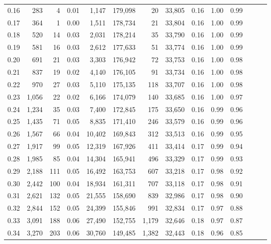 \begin{tabular}{rrrrrrrrrrrrrr}
0.16 &    283 &    4 &  0.01 &    1,147 &  179,098 &      20 &  33,805 &  0.16 &  1.00 &      0.99 \\
0.17 &    364 &    1 &  0.00 &    1,511 &  178,734 &      21 &  33,804 &  0.16 &  1.00 &      0.99 \\
0.18 &    520 &   14 &  0.03 &    2,031 &  178,214 &      35 &  33,790 &  0.16 &  1.00 &      0.99 \\
0.19 &    581 &   16 &  0.03 &    2,612 &  177,633 &      51 &  33,774 &  0.16 &  1.00 &      0.99 \\
0.20 &    691 &   21 &  0.03 &    3,303 &  176,942 &      72 &  33,753 &  0.16 &  1.00 &      0.98 \\
0.21 &    837 &   19 &  0.02 &    4,140 &  176,105 &      91 &  33,734 &  0.16 &  1.00 &      0.98 \\
0.22 &    970 &   27 &  0.03 &    5,110 &  175,135 &     118 &  33,707 &  0.16 &  1.00 &      0.98 \\
0.23 &  1,056 &   22 &  0.02 &    6,166 &  174,079 &     140 &  33,685 &  0.16 &  1.00 &      0.97 \\
0.24 &  1,234 &   35 &  0.03 &    7,400 &  172,845 &     175 &  33,650 &  0.16 &  0.99 &      0.96 \\
0.25 &  1,435 &   71 &  0.05 &    8,835 &  171,410 &     246 &  33,579 &  0.16 &  0.99 &      0.96 \\
0.26 &  1,567 &   66 &  0.04 &   10,402 &  169,843 &     312 &  33,513 &  0.16 &  0.99 &      0.95 \\
0.27 &  1,917 &   99 &  0.05 &   12,319 &  167,926 &     411 &  33,414 &  0.17 &  0.99 &      0.94 \\
0.28 &  1,985 &   85 &  0.04 &   14,304 &  165,941 &     496 &  33,329 &  0.17 &  0.99 &      0.93 \\
0.29 &  2,188 &  111 &  0.05 &   16,492 &  163,753 &     607 &  33,218 &  0.17 &  0.98 &      0.92 \\
0.30 &  2,442 &  100 &  0.04 &   18,934 &  161,311 &     707 &  33,118 &  0.17 &  0.98 &      0.91 \\
0.31 &  2,621 &  132 &  0.05 &   21,555 &  158,690 &     839 &  32,986 &  0.17 &  0.98 &      0.90 \\
0.32 &  2,844 &  152 &  0.05 &   24,399 &  155,846 &     991 &  32,834 &  0.17 &  0.97 &      0.88 \\
0.33 &  3,091 &  188 &  0.06 &   27,490 &  152,755 &   1,179 &  32,646 &  0.18 &  0.97 &      0.87 \\
0.34 &  3,270 &  203 &  0.06 &   30,760 &  149,485 &   1,382 &  32,443 &  0.18 &  0.96 &      0.85 \\

\end{tabular}
